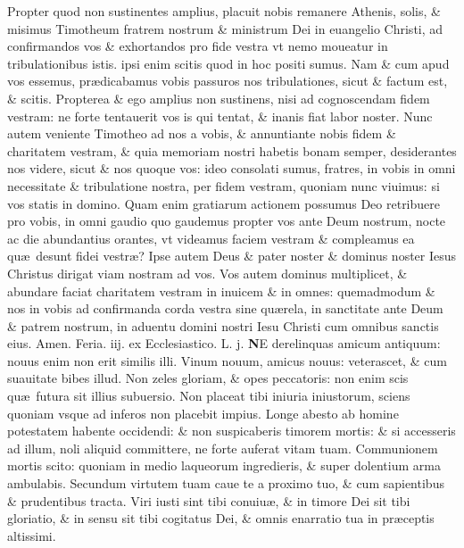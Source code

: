 \documentclass[a5paper,10pt]{book}
\def\leftmarginnote{%
	\lrmarginnote{\hskip -\marginparsep \hskip -6.5em}}
\def\rightmarginnote{%
	\lrmarginnote{\hskip\columnwidth \hskip -1em}}
\def\ae{æ}
\begin{document}
\begin{multicols*}{2}
Propter\leftmarginnote{\begin{flushright}ca. 3.\end{flushright}} quod non sustinentes amplius, placuit nobis remanere Athenis, solis, \& misimus Timotheum fratrem nostrum \& ministrum Dei in euangelio Christi, ad confirmandos vos \& exhortandos pro fide vestra vt nemo moueatur in tribulationibus istis. ipsi enim scitis quod in hoc positi sumus.
Nam \& cum apud vos essemus, pr\ae dicabamus vobis passuros nos tribulationes, sicut \& factum est, \& scitis.
Propterea \& ego amplius non sustinens, nisi ad cognoscendam fidem vestram: ne forte tentauerit vos is qui tentat, \& inanis fiat labor noster.
Nunc autem veniente Timotheo ad nos a vobis, \& annuntiante nobis fidem \& charitatem vestram, \& quia memoriam nostri habetis bonam semper, desiderantes nos videre, sicut \& nos quoque vos: ideo consolati sumus, fratres, in vobis in omni necessitate \& tribulatione nostra, per fidem vestram, quoniam nunc viuimus: si vos statis in domino.
Quam enim
gratiarum actionem possumus Deo retribuere pro vobis, in omni gaudio quo gaudemus propter vos ante Deum nostrum, nocte ac die abundantius orantes, vt videamus faciem vestram \& compleamus ea qu\ae \ desunt fidei vestr\ae ?
Ipse autem Deus \& pater noster \& dominus noster Iesus Christus dirigat viam nostram ad vos. Vos autem dominus multiplicet, \& abundare faciat charitatem vestram in inuicem \& in omnes: quemadmodum \& nos in vobis ad confirmanda corda vestra sine qu\ae rela, in sanctitate ante Deum \& patrem nostrum, in aduentu domini nostri Iesu Christi cum omnibus sanctis eius. Amen.
\newline {} \color{red} \hypertarget{TUE-TERTIA-VAGAN}{Feria. iij.} ex Ecclesiastico. \quad L. j. \color{black}
\lettrine[lines=2]{\bfseries N}{}E\rightmarginnote{ca. 9.} derelinquas amicum antiquum: nouus enim non erit similis illi.
Vinum nouum, amicus nouus: veterascet, \& cum suauitate bibes illud.
Non zeles gloriam, \& opes peccatoris: non enim scis qu\ae \ futura sit illius subuersio. Non placeat tibi iniuria iniustorum, sciens quoniam vsque ad inferos non placebit impius.
Longe abesto ab homine potestatem habente occidendi: \& non suspicaberis timorem mortis: \& si accesseris ad illum, noli aliquid committere, ne forte auferat vitam tuam.
Communionem mortis scito: quoniam in medio laqueorum ingredieris, \& super dolentium arma ambulabis.
Secundum virtutem tuam caue te a proximo tuo, \& cum sapientibus \& prudentibus tracta. Viri iusti sint tibi conuiu\ae , \& in timore Dei sit tibi gloriatio, \& in sensu sit tibi cogitatus Dei, \& omnis enarratio tua in pr\ae ceptis altissimi.

\end{multicols*}
\end{document}
